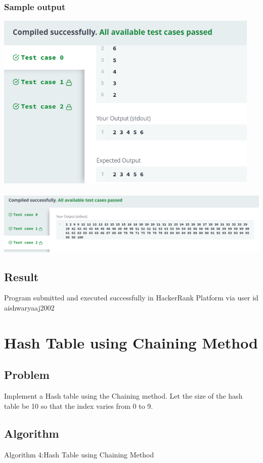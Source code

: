 \documentclass[14pt, letterpaper]{article}
\begin{document}
\subsubsection{Sample output}
\includegraphics[width=5in]{images/mergeSort1.png}\\ \\
\includegraphics[width=7in]{images/mergeSort2.png}
\subsection{Result}
Program submitted and executed successfully in HackerRank Platform via user id aishwaryaaj2002
\newpage
\section{Hash Table using Chaining Method}

\subsection{Problem}
Implement a Hash table using the Chaining method. Let the size of the hash table be 10 so
that the index varies from 0 to 9.
\subsection{Algorithm}
\hline 
\vspace{0.1cm}
\hspace{0.5 cm}Algorithm 4:Hash Table using Chaining Method
\vspace{0.1cm}
\hline
\end{document}
